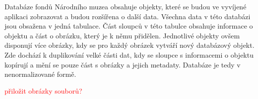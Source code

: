 Databáze fondů Národního muzea obsahuje objekty, které se budou ve 
vyvíjené aplikaci zobrazovat a budou rozšířena o další data. Všechna data 
v této databázi jsou obsažena v jedná tabulace. Část sloupců v této tabulce 
obsahuje informace o objektu a část o obrázku, který je k němu přidělen. 
Jednotlivé objekty ovšem disponují více obrázky, kdy se pro každý obrázek 
vytváří nový databázový objekt. Zde dochází k duplikování velké části dat, 
kdy se sloupce s informacemi o objektu kopírují a mění se pouze část s 
obrázky a jejich metadaty. Databáze je tedy v nenormalizované formě.

\textcolor{red}{přiložit obrázky souborů?}


